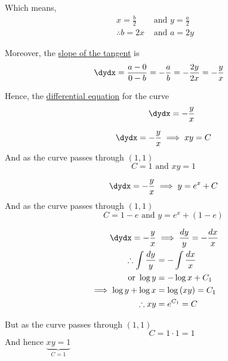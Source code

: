 \documentclass[14pt,fleqn]{extarticle}
\begin{document}
\begin{problem}
\begin{step}
       Which means, 
       \begin{align}
       x = \frac{b}{2}&\text{ and } y = \frac{a}{2} \\
       \therefore b = 2x&\text{ and } a = 2y 
\end{align}

Moreover, the \underline{slope of the tangent} is 
\[ \quad \dydx = \dfrac{a-0}{0-b} = -\frac{a}{b} = -\frac{2y}{2x} = -\frac{y}{x}\]

Hence, the \underline{differential equation} for the curve
\[ \qquad\qquad \dydx = -\frac{y}{x}\]
\end{step}

\begin{step}
  \begin{options} 
     \correct 
       \[ \qquad\dydx = -\frac{y}{x}\implies xy = C \]
       And as the curve passes through $(1,1)$
       \[ \qquad C =1\text{ and } xy = 1\]
     \incorrect
     
       \[ \qquad\dydx = -\frac{y}{x}\implies y = e^x + C \]
       And as the curve passes through $(1,1)$
       \[ \qquad C = 1-e \text{ and } y = e^x + (1-e) \]
        
    \end{options} 
     \reason 
       
       \begin{align}
       \dydx = -\frac{y}{x} &\implies \frac{dy}{y} = -\frac{dx}{x} \\
       \therefore \int\frac{dy}{y} &= -\int\frac{dx}{x} \\
       \text{or } \log y &= -\log x + C_1 \\
       \implies \log y + \log x &= \log \left(xy \right) = C_1 \\
       \therefore xy &= e^{C_1} = C 
\end{align}

       But as the curve passes through $(1,1)$
       \[ \qquad\qquad C = 1\cdot 1 = 1\]
       And hence $\underbrace{xy = 1}_{C = 1}$
\end{step}
\end{problem} 
\end{document}

